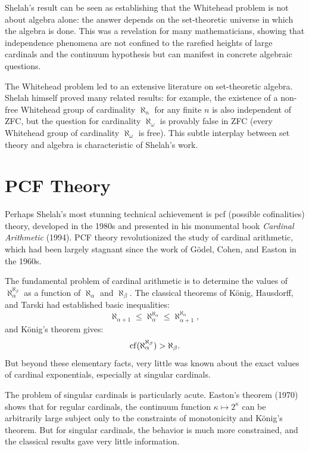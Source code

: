 \begin{remark}
Shelah's result can be seen as establishing that the Whitehead problem is not about algebra alone: the answer depends on the set-theoretic universe in which the algebra is done. This was a revelation for many mathematicians, showing that independence phenomena are not confined to the rarefied heights of large cardinals and the continuum hypothesis but can manifest in concrete algebraic questions.
\end{remark}

The Whitehead problem led to an extensive literature on set-theoretic algebra. Shelah himself proved many related results: for example, the existence of a non-free Whitehead group of cardinality \(\aleph_n\) for any finite \(n\) is also independent of ZFC, but the question for cardinality \(\aleph_\omega\) is provably false in ZFC (every Whitehead group of cardinality \(\aleph_\omega\) is free). This subtle interplay between set theory and algebra is characteristic of Shelah's work.

\section{PCF Theory}

Perhaps Shelah's most stunning technical achievement is pcf (possible cofinalities) theory, developed in the 1980s and presented in his monumental book \textit{Cardinal Arithmetic} (1994). PCF theory revolutionized the study of cardinal arithmetic, which had been largely stagnant since the work of G\"odel, Cohen, and Easton in the 1960s.

The fundamental problem of cardinal arithmetic is to determine the values of \(\aleph_\alpha^{\aleph_\beta}\) as a function of \(\aleph_\alpha\) and \(\aleph_\beta\). The classical theorems of K\"onig, Hausdorff, and Tarski had established basic inequalities:
\[
\aleph_{\alpha+1} \leq \aleph_\alpha^{\aleph_\alpha} \leq \aleph_{\alpha+1}^{\aleph_\alpha},
\]
and K\"onig's theorem gives:
\[
\operatorname{cf}(\aleph_\alpha^{\aleph_\beta}) > \aleph_\beta.
\]
But beyond these elementary facts, very little was known about the exact values of cardinal exponentials, especially at singular cardinals.

The problem of singular cardinals is particularly acute. Easton's theorem (1970) shows that for regular cardinals, the continuum function \(\kappa \mapsto 2^\kappa\) can be arbitrarily large subject only to the constraints of monotonicity and K\"onig's theorem. But for singular cardinals, the behavior is much more constrained, and the classical results gave very little information.

